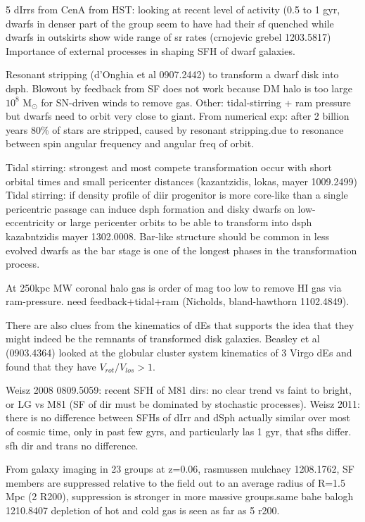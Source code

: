 \documentclass[12pt,preprint]{emulateapj}
\begin{document}
5 dIrrs from CenA from HST: looking at recent level of activity (0.5 to 1 gyr, dwarfs in denser part of the group seem to have had their sf quenched while 
dwarfs in outskirts show wide range of sr rates (crnojevic grebel 1203.5817) Importance of external processes in shaping SFH of dwarf galaxies.

Resonant stripping (d'Onghia et al 0907.2442) to transform a dwarf disk into dsph. Blowout by feedback from SF does not work because DM halo is too 
large $10^8$ M$_\odot$ for SN-driven winds to remove gas. Other: tidal-stirring + ram pressure but dwarfs need to orbit very close to giant. From numerical 
exp: after 2 billion years 80\% of stars are stripped, caused by resonant stripping.due to resonance between spin angular frequency and angular freq of orbit.

Tidal stirring: strongest and most compete transformation occur with short orbital times and small pericenter distances (kazantzidis, lokas, mayer 1009.2499)
Tidal stirring: if density profile of diir progenitor is more core-like than a single pericentric passage can induce dsph formation and disky dwarfs on low-eccentricity 
or large pericenter orbits to be able to transform into dsph kazabntzidis mayer 1302.0008. Bar-like structure should be common in less evolved dwarfs as the
bar stage is one of the longest phases in the transformation process.

At 250kpc MW coronal halo gas is order of mag too low to remove HI gas via ram-pressure. need feedback+tidal+ram (Nicholds, bland-hawthorn 1102.4849).

There are also clues from the kinematics of dEs that supports the idea that they might indeed be the remnants of transformed disk galaxies. Beasley et al 
(0903.4364) looked at the globular cluster system kinematics of 3 Virgo dEs and found that they have $V_{rot}/V_{los} > 1$.

Weisz 2008 0809.5059: recent SFH of M81 dirs: no clear trend vs faint to bright, or LG vs M81 (SF of dir must be dominated by stochastic processes).
Weisz 2011: there is no difference between SFHs of dIrr and dSph actually similar over most of cosmic time, only in past few gyrs, and particularly las 1 gyr, 
that sfhs differ. sfh dir and trans no difference.

From galaxy imaging in 23 groups at z=0.06, rasmussen mulchaey 1208.1762, SF members are suppressed relative to the field out to an average radius of 
R=1.5 Mpc (2 R200), suppression is stronger in more massive groups.same bahe balogh 1210.8407 depletion of hot and cold gas is seen as far as 5 r200.
\end{document}
